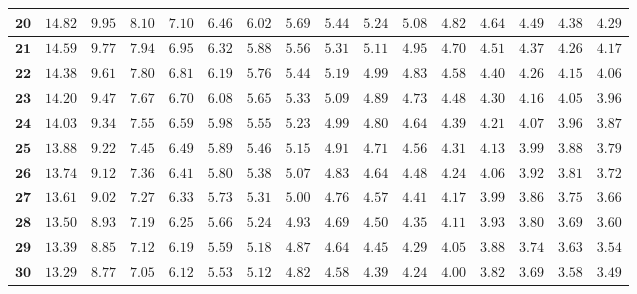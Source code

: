 \begin{alternateColorTable}
\begin{longtable}{|r|r|r|r|r|r|r|r|r|r|r|r|r|r|r|r|}
    \(\mathbf{20}\) & \(14.82\) & \(9.95\) & \(8.10\) & \(7.10\) & \(6.46\) & \(6.02\) & \(5.69\) & \(5.44\) & \(5.24\) & \(5.08\) & \(4.82\) & \(4.64\) & \(4.49\) & \(4.38\) & \(4.29\) \\ \hline 
    \(\mathbf{21}\) & \(14.59\) & \(9.77\) & \(7.94\) & \(6.95\) & \(6.32\) & \(5.88\) & \(5.56\) & \(5.31\) & \(5.11\) & \(4.95\) & \(4.70\) & \(4.51\) & \(4.37\) & \(4.26\) & \(4.17\) \\ \hline 
    \(\mathbf{22}\) & \(14.38\) & \(9.61\) & \(7.80\) & \(6.81\) & \(6.19\) & \(5.76\) & \(5.44\) & \(5.19\) & \(4.99\) & \(4.83\) & \(4.58\) & \(4.40\) & \(4.26\) & \(4.15\) & \(4.06\) \\ \hline 
    \(\mathbf{23}\) & \(14.20\) & \(9.47\) & \(7.67\) & \(6.70\) & \(6.08\) & \(5.65\) & \(5.33\) & \(5.09\) & \(4.89\) & \(4.73\) & \(4.48\) & \(4.30\) & \(4.16\) & \(4.05\) & \(3.96\) \\ \hline 
    \(\mathbf{24}\) & \(14.03\) & \(9.34\) & \(7.55\) & \(6.59\) & \(5.98\) & \(5.55\) & \(5.23\) & \(4.99\) & \(4.80\) & \(4.64\) & \(4.39\) & \(4.21\) & \(4.07\) & \(3.96\) & \(3.87\) \\ \hline 
    \(\mathbf{25}\) & \(13.88\) & \(9.22\) & \(7.45\) & \(6.49\) & \(5.89\) & \(5.46\) & \(5.15\) & \(4.91\) & \(4.71\) & \(4.56\) & \(4.31\) & \(4.13\) & \(3.99\) & \(3.88\) & \(3.79\) \\ \hline 
    \(\mathbf{26}\) & \(13.74\) & \(9.12\) & \(7.36\) & \(6.41\) & \(5.80\) & \(5.38\) & \(5.07\) & \(4.83\) & \(4.64\) & \(4.48\) & \(4.24\) & \(4.06\) & \(3.92\) & \(3.81\) & \(3.72\) \\ \hline 
    \(\mathbf{27}\) & \(13.61\) & \(9.02\) & \(7.27\) & \(6.33\) & \(5.73\) & \(5.31\) & \(5.00\) & \(4.76\) & \(4.57\) & \(4.41\) & \(4.17\) & \(3.99\) & \(3.86\) & \(3.75\) & \(3.66\) \\ \hline 
    \(\mathbf{28}\) & \(13.50\) & \(8.93\) & \(7.19\) & \(6.25\) & \(5.66\) & \(5.24\) & \(4.93\) & \(4.69\) & \(4.50\) & \(4.35\) & \(4.11\) & \(3.93\) & \(3.80\) & \(3.69\) & \(3.60\) \\ \hline 
    \(\mathbf{29}\) & \(13.39\) & \(8.85\) & \(7.12\) & \(6.19\) & \(5.59\) & \(5.18\) & \(4.87\) & \(4.64\) & \(4.45\) & \(4.29\) & \(4.05\) & \(3.88\) & \(3.74\) & \(3.63\) & \(3.54\) \\ \hline 
    \(\mathbf{30}\) & \(13.29\) & \(8.77\) & \(7.05\) & \(6.12\) & \(5.53\) & \(5.12\) & \(4.82\) & \(4.58\) & \(4.39\) & \(4.24\) & \(4.00\) & \(3.82\) & \(3.69\) & \(3.58\) & \(3.49\) \\ \hline 

\end{longtable}
\end{alternateColorTable}
